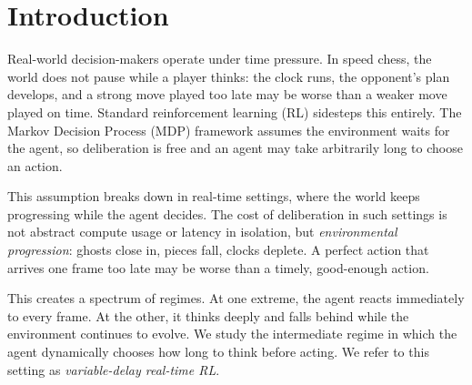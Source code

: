 \begin{abstract}
Deliberating takes time. In real-time settings, that time is not free.
Standard reinforcement learning (RL) sidesteps this as the environment waits indefinitely
for the agent's decision.
Instead, here, we study environments that progress while waiting for the agent's action, which naturally creates a \textit{cost of deliberation}.
Crucially, there are state-dependent trade-offs between deliberating longer and reacting quickly. Furthermore, deliberating how much to deliberate, in the limit, risks complete paralysis.
We resolve this with a two-step process.
First, we train a standard MCTS policy.
Second, we train a \textit{lightweight} gating policy that decides how many search steps to invest at each state. Our gating policy consistently outperforms fixed-budget baselines and hand-coded heuristics while using less average compute.
We validate the full pipeline in a true two-GPU real-time setup across real-time Pac-Man, Tetris, Snake, Speed Hex, and Speed Go.

\end{abstract}

\section{Introduction}

Real-world decision-makers operate under time pressure.
In speed chess, the world does not pause while a player thinks: the clock
runs, the opponent's plan develops, and a strong move played too late may be
worse than a weaker move played on time.
Standard reinforcement learning (RL) sidesteps this entirely.
The Markov Decision Process (MDP) framework assumes the environment waits for
the agent, so deliberation is free and an agent may take arbitrarily long to
choose an action.

This assumption breaks down in real-time settings, where the world keeps
progressing while the agent decides.
The cost of deliberation in such settings is not abstract compute usage or
latency in isolation, but \emph{environmental progression}: ghosts close in,
pieces fall, clocks deplete.
A perfect action that arrives one frame too late may be worse than a timely,
good-enough action.

This creates a spectrum of regimes.
At one extreme, the agent reacts immediately to every frame.
At the other, it thinks deeply and falls behind while the environment
continues to evolve.
We study the intermediate regime in which the agent dynamically chooses how
long to think before acting.
We refer to this setting as \emph{variable-delay real-time RL}.

